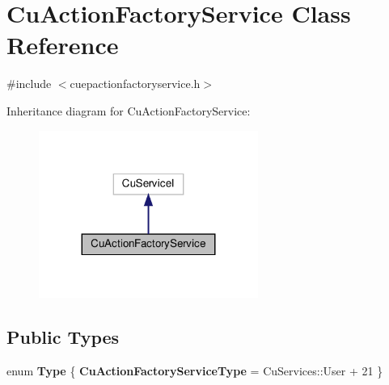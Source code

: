 \section{Cu\+Action\+Factory\+Service Class Reference}
\label{classCuActionFactoryService}


{\ttfamily \#include $<$cuepactionfactoryservice.\+h$>$}



Inheritance diagram for Cu\+Action\+Factory\+Service\+:\nopagebreak
\begin{figure}[H]
\begin{center}
\leavevmode
\includegraphics[width=203pt]{classCuActionFactoryService__inherit__graph}
\end{center}
\end{figure}
\subsection*{Public Types}
\begin{DoxyCompactItemize}
\item 
enum \textbf{ Type} \{ \textbf{ Cu\+Action\+Factory\+Service\+Type} = Cu\+Services\+:\+:User + 21
 \}
\end{DoxyCompactItemize}

